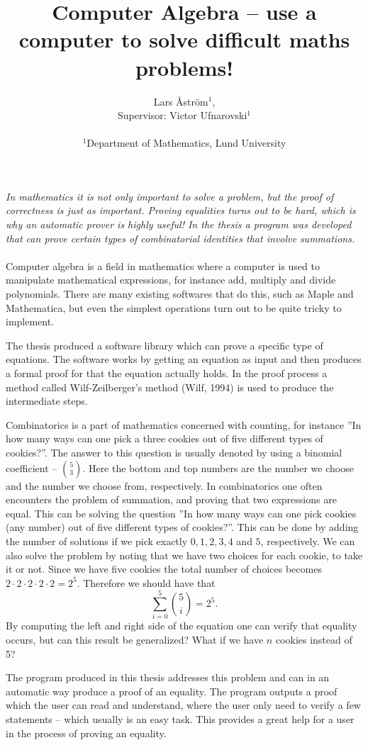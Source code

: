 \documentclass[letterpaper]{article}
\title{Computer Algebra -- use a computer to solve difficult maths problems!}
\author{Lars Åström$^{1}$, \\ Supervisor: Victor Ufnarovski$^{1}$\\
\mbox{}\\
$^1$Department of Mathematics, Lund University
}
\begin{document}
\maketitle
\Large
\textit{
In mathematics it is not only important to solve a problem, but the proof of correctness is just as important. Proving equalities turns out to be hard, which is why an automatic prover is highly useful! In the thesis a program was developed that can prove certain types of combinatorial identities that involve summations.
}
\\ \\
\normalsize
Computer algebra is a field in mathematics where a computer is used to manipulate mathematical expressions, for instance add, multiply and divide polynomials. There are many existing softwares that do this, such as Maple and Mathematica, but even the simplest operations turn out to be quite tricky to implement.

The thesis produced a software library which can prove a specific type of equations. The software works by getting an equation as input and then produces a formal proof for that the equation actually holds. In the proof process a method called Wilf-Zeilberger's method (Wilf, 1994) is used to produce the intermediate steps.

Combinatorics is a part of mathematics concerned with counting, for instance ''In how many ways can one pick a three cookies out of five different types of cookies?''. The answer to this question is usually denoted by using a binomial coefficient -- $\binom{5}{3}$. Here the bottom and top numbers are the number we choose and the number we choose from, respectively. In combinatorics one often encounters the problem of summation, and proving that two expressions are equal. This can be solving the question ''In how many ways can one pick cookies (any number) out of five different types of cookies?''. This can be done by adding the number of solutions if we pick exactly $0,1,2,3,4$ and $5$, respectively. We can also solve the problem by noting that we have two choices for each cookie, to take it or not. Since we have five cookies the total number of choices becomes $2\cdot 2\cdot 2\cdot 2\cdot 2=2^5$. Therefore we should have that $$\sum_{i=0}^5 \binom{5}{i}=2^5.$$ By computing the left and right side of the equation one can verify that equality occurs, but can this result be generalized? What if we have $n$ cookies instead of 5?

The program produced in this thesis addresses this problem and can in an automatic way produce a proof of an equality. The program outputs a proof which the user can read and understand, where the user only need to verify a few statements -- which usually is an easy task. This provides a great help for a user in the process of proving an equality.
\end{document}
